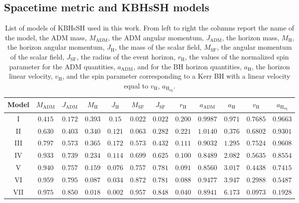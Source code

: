\documentclass[twocolumn,aps,showpacs,showkeys,prd,superscriptaddress,byrevtex, amsmath]{revtex4-1}
\begin{document}
\subsection{Spacetime metric and KBHsSH models}


\begin{table}
\caption{List of models of KBHsSH used in this work. From left to right the columns report the name of the model, the ADM mass, $M_{\mathrm{ADM}}$, the ADM angular momentum, $J_{\mathrm{ADM}}$, the horizon mass, $M_{\mathrm{H}}$, the horizon angular momentum, $J_{\mathrm{H}}$, the mass of the scalar field, $M_{\mathrm{SF}}$, the angular momentum of the scalar field, $J_{\mathrm{SF}}$, the radius of the event horizon, $r_{\mathrm{H}}$, the values of the normalized spin parameter for the ADM quantities, $a_{\mathrm{ADM}}$, and for the BH horizon quantities, $a_{\mathrm{H}}$, the horizon linear velocity, $v_{\mathrm{H}}$, and the spin parameter corresponding to a Kerr BH with a linear velocity equal to $v_{\mathrm{H}}$, $a_{\mathrm{H_{eq}}}$.}        
\label{models_list}      
\centering          
\begin{tabular}{c c c c  c c c c   c c c c}
\hline\hline       
 Model & $M_{\mathrm{ADM}}$ & $J_{\mathrm{ADM}}$ & $M_{\mathrm{H}}$ &  $J_{\mathrm{H}}$ & $M_{\mathrm{SF}}$ & $J_{\mathrm{SF}}$ & $r_{\mathrm{H}}$ & $a_{\mathrm{ADM}}$ & $a_{\mathrm{H}}$ & $v_{\mathrm{H}}$ & $a_{\mathrm{H_{eq}}}$ \\ 
\hline           
I & $0.415$ & $0.172$ & $0.393$ &  $0.15$  & $0.022$ & $0.022$ & $0.200$ & $0.9987$ & $0.971$ & $0.7685$ & $0.9663$\\ 
 \hline 
II & $0.630$ & $0.403$ & $0.340$ &  $0.121$  & $0.063$ & $0.282$ & $0.221$ & $1.0140$ & $0.376$ & $0.6802$ & $0.9301$ \\
 \hline 
III & $0.797$ & $0.573$ & $0.365$ &  $0.172$  & $0.573$ & $0.432$ & $0.111$ & $0.9032$ & $1.295$ & $0.7524$ & $0.9608$ \\ 
 \hline 
IV & $0.933$ & $0.739$ & $0.234$ &  $0.114$  & $0.699$ & $0.625$ & $0.100$ & $0.8489$ & $2.082$ & $0.5635$ & $0.8554$ \\ 
 \hline 
V & $0.940$ & $0.757$ & $0.159$ &  $0.076$  & $0.757$ & $0.781$ & $0.091$ & $0.8560$ & $3.017$ & $0.4438$ & $0.7415$ \\ 
 \hline 
VI & $0.959$ & $0.795$ & $0.087$ &  $0.034$  & $0.872$ & $0.781$ & $0.088$ & $0.9477$ & $3.947$ & $0.2988$ & $0.5487$ \\ 
 \hline 
VII & $0.975$ & $0.850$ & $0.018$ &  $0.002$  & $0.957$ & $0.848$ & $0.040$ & $0.8941$ & $6.173$ & $0.0973$ & $0.1928$ \\ 
\hline      
\end{tabular}
\end{table}
\end{document}
